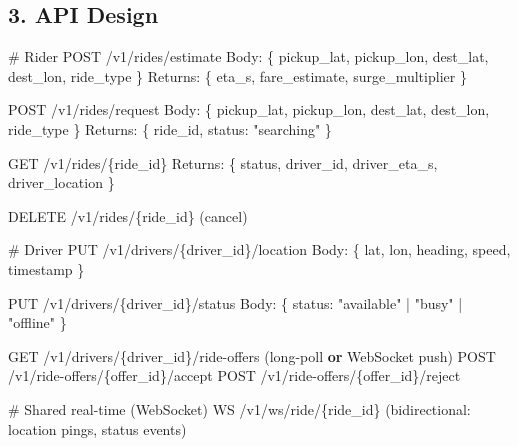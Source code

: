 \documentclass[11pt]{article}
\newenvironment{Shaded}{\begin{snugshade}}{\end{snugshade}}
\newcommand{\BuiltInTok}[1]{\textcolor[rgb]{0.50,0.55,0.55}{#1}}
\newcommand{\CommentTok}[1]{\textcolor[rgb]{0.48,0.49,0.49}{#1}}
\newcommand{\KeywordTok}[1]{\textcolor[rgb]{0.81,0.81,0.76}{\textbf{#1}}}
\newcommand{\NormalTok}[1]{\textcolor[rgb]{0.81,0.81,0.76}{#1}}
\newcommand{\OperatorTok}[1]{\textcolor[rgb]{0.81,0.81,0.76}{#1}}
\newcommand{\StringTok}[1]{\textcolor[rgb]{0.96,0.31,0.31}{#1}}
\begin{document}
\subsection{3. API Design}\label{3-api-design-1}


\begin{Shaded}
\begin{Highlighting}[]
\CommentTok{\# Rider}
\NormalTok{POST   }\OperatorTok{/}\NormalTok{v1}\OperatorTok{/}\NormalTok{rides}\OperatorTok{/}\NormalTok{estimate}
\NormalTok{       Body: \{ pickup\_lat, pickup\_lon, dest\_lat, dest\_lon, ride\_type \}}
\NormalTok{       Returns: \{ eta\_s, fare\_estimate, surge\_multiplier \}}

\NormalTok{POST   }\OperatorTok{/}\NormalTok{v1}\OperatorTok{/}\NormalTok{rides}\OperatorTok{/}\NormalTok{request}
\NormalTok{       Body: \{ pickup\_lat, pickup\_lon, dest\_lat, dest\_lon, ride\_type \}}
\NormalTok{       Returns: \{ ride\_id, status: }\StringTok{"searching"}\NormalTok{ \}}

\NormalTok{GET    }\OperatorTok{/}\NormalTok{v1}\OperatorTok{/}\NormalTok{rides}\OperatorTok{/}\NormalTok{\{ride\_id\}}
\NormalTok{       Returns: \{ status, driver\_id, driver\_eta\_s, driver\_location \}}

\NormalTok{DELETE }\OperatorTok{/}\NormalTok{v1}\OperatorTok{/}\NormalTok{rides}\OperatorTok{/}\NormalTok{\{ride\_id\}      (cancel)}

\CommentTok{\# Driver}
\NormalTok{PUT    }\OperatorTok{/}\NormalTok{v1}\OperatorTok{/}\NormalTok{drivers}\OperatorTok{/}\NormalTok{\{driver\_id\}}\OperatorTok{/}\NormalTok{location}
\NormalTok{       Body: \{ lat, lon, heading, speed, timestamp \}}

\NormalTok{PUT    }\OperatorTok{/}\NormalTok{v1}\OperatorTok{/}\NormalTok{drivers}\OperatorTok{/}\NormalTok{\{driver\_id\}}\OperatorTok{/}\NormalTok{status}
\NormalTok{       Body: \{ status: }\StringTok{"available"} \OperatorTok{|} \StringTok{"busy"} \OperatorTok{|} \StringTok{"offline"}\NormalTok{ \}}

\NormalTok{GET    }\OperatorTok{/}\NormalTok{v1}\OperatorTok{/}\NormalTok{drivers}\OperatorTok{/}\NormalTok{\{driver\_id\}}\OperatorTok{/}\NormalTok{ride}\OperatorTok{{-}}\NormalTok{offers   (}\BuiltInTok{long}\OperatorTok{{-}}\NormalTok{poll }\KeywordTok{or}\NormalTok{ WebSocket push)}
\NormalTok{POST   }\OperatorTok{/}\NormalTok{v1}\OperatorTok{/}\NormalTok{ride}\OperatorTok{{-}}\NormalTok{offers}\OperatorTok{/}\NormalTok{\{offer\_id\}}\OperatorTok{/}\NormalTok{accept}
\NormalTok{POST   }\OperatorTok{/}\NormalTok{v1}\OperatorTok{/}\NormalTok{ride}\OperatorTok{{-}}\NormalTok{offers}\OperatorTok{/}\NormalTok{\{offer\_id\}}\OperatorTok{/}\NormalTok{reject}

\CommentTok{\# Shared real{-}time (WebSocket)}
\NormalTok{WS }\OperatorTok{/}\NormalTok{v1}\OperatorTok{/}\NormalTok{ws}\OperatorTok{/}\NormalTok{ride}\OperatorTok{/}\NormalTok{\{ride\_id\}   (bidirectional: location pings, status events)}
\end{Highlighting}
\end{Shaded}
\end{document}
